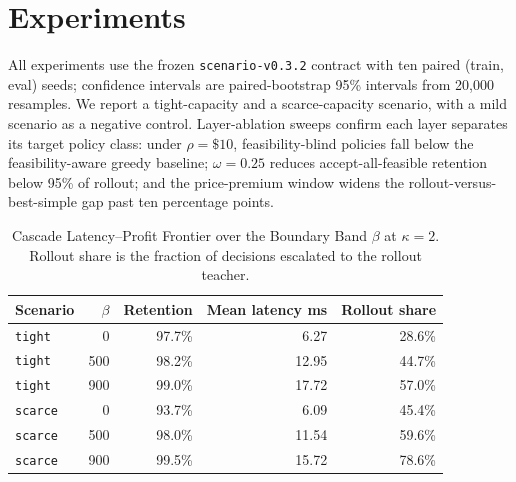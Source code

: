 \documentclass[numbered]{trbunofficial}
\begin{document}
\section{Experiments}
All experiments use the frozen \texttt{scenario-v0.3.2} contract with ten
paired (train, eval) seeds; confidence intervals are paired-bootstrap 95\%
intervals from 20{,}000 resamples. We report a tight-capacity and a
scarce-capacity scenario, with a mild scenario as a negative control.
Layer-ablation sweeps confirm each layer separates its target policy class:
under $\rho=\$10$, feasibility-blind policies fall below the
feasibility-aware greedy baseline; $\omega=0.25$ reduces
accept-all-feasible retention below 95\% of rollout; and the price-premium
window widens the rollout-versus-best-simple gap past ten percentage
points.

\begin{table}[t]
\caption{Ten-Seed Methods Comparison under scenario-v0.3.2. Retention is
mean closed-loop profit relative to the rollout teacher; the cascade uses
band $\beta=\$500$ at scarcity threshold $\kappa=2$. The last column is the
paired-bootstrap 95\% CI on the cascade$-$rollout profit delta ($n=10$); an
interval containing \$0 means the cascade is statistically indistinguishable
from rollout.}
\label{tab:methods}
\centering\small
{}
\end{table}

\begin{table}[t]
\caption{Cascade Latency--Profit Frontier over the Boundary Band $\beta$ at
$\kappa=2$. Rollout share is the fraction of decisions escalated to the
rollout teacher.}
\label{tab:frontier}
\centering\small
\begin{tabular}{lrrrr}
\toprule
Scenario & $\beta$ & Retention & Mean latency ms & Rollout share \\
\midrule
\texttt{tight}  &   0 & 97.7\% &  6.27 & 28.6\% \\
\texttt{tight}  & 500 & 98.2\% & 12.95 & 44.7\% \\
\texttt{tight}  & 900 & 99.0\% & 17.72 & 57.0\% \\
\texttt{scarce} &   0 & 93.7\% &  6.09 & 45.4\% \\
\texttt{scarce} & 500 & 98.0\% & 11.54 & 59.6\% \\
\texttt{scarce} & 900 & 99.5\% & 15.72 & 78.6\% \\
\bottomrule
\end{tabular}
\end{table}
\end{document}
